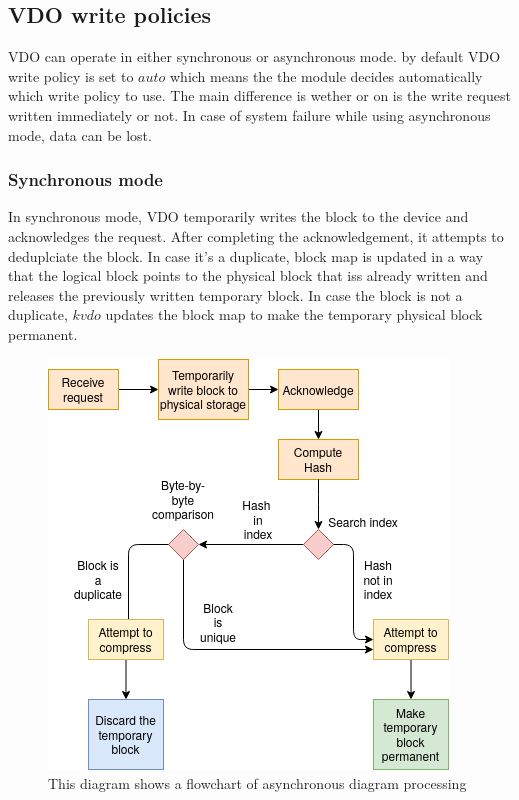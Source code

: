 \documentclass[
  color, %
  table, %
  lof,   %
  lot,   %
]{fithesis3}
\begin{document}
\subsection{VDO write policies}
VDO can operate in either synchronous or asynchronous mode.\cite{man:writemodes} by default VDO write policy is set to $auto$ which means the the module decides automatically which write policy to use. The main difference is wether or on is the write request written immediately or not. In case of system failure while using asynchronous mode, data can be lost.

\subsubsection{Synchronous mode}
In synchronous mode, VDO temporarily writes the block to the device and acknowledges the request. After completing the acknowledgement, it attempts to deduplciate the block. In case it's a duplicate, block map is updated in a way that the logical block points to the physical block that iss already written and releases the previously written temporary block. In case the block is not a duplicate, $kvdo$ updates the block map to make the temporary physical block permanent.

\begin{figure}[!htb]
        \centering
        \includegraphics[width=\textwidth]{graphics/diagrams/sync.png}
\caption[Synchronous write mode]{This diagram shows a flowchart of asynchronous diagram processing}
\label{fig:sync}
\end{figure}
\end{document}
